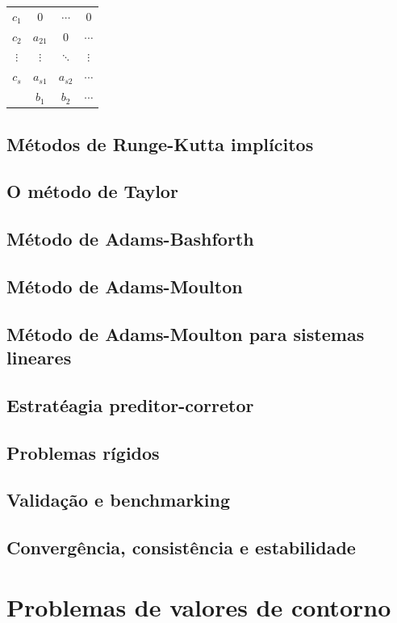 \documentclass{article}
\begin{document}
\begin{center}
    \begin{tabular}{c|ccc}
        \(c_1\) & 0 & \(\cdots\) & 0 \\
        \(c_2\) & \(a_{21}\) & 0 & \(\cdots\) \\
        \(\vdots\) & \(\vdots\) & \(\ddots\) & \(\vdots\) \\
        \(c_s\) & \(a_{s1}\) & \(a_{s2}\) & \(\cdots\) \\
        \hline
        & \(b_1\) & \(b_2\) & \(\cdots\)
    \end{tabular}
\end{center}

\subsection{Métodos de Runge-Kutta implícitos}
\subsection{O método de Taylor}
\subsection{Método de Adams-Bashforth}
\subsection{Método de Adams-Moulton}
\subsection{Método de Adams-Moulton para sistemas lineares}
\subsection{Estratéagia preditor-corretor}
\subsection{Problemas rígidos}
\subsection{Validação e benchmarking}
\subsection{Convergência, consistência e estabilidade}

\section{Problemas de valores de contorno}
\end{document}
